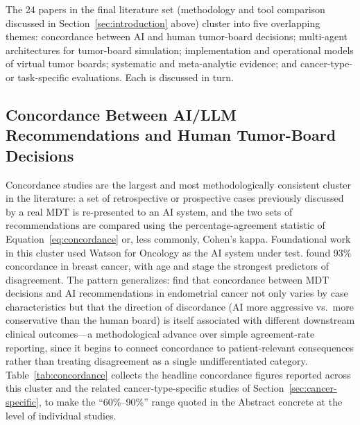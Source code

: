 \documentclass[acmsmall,screen=true,review=false,nonacm=true]{acmart}
\begin{document}
The 24 papers in the final literature set (methodology and tool comparison discussed in Section~\ref{sec:introduction} above) cluster into five overlapping themes: concordance between AI and human tumor-board decisions; multi-agent architectures for tumor-board simulation; implementation and operational models of virtual tumor boards; systematic and meta-analytic evidence; and cancer-type- or task-specific evaluations. Each is discussed in turn.

\subsection{Concordance Between AI/LLM Recommendations and Human Tumor-Board Decisions}
\label{sec:concordance}

Concordance studies are the largest and most methodologically consistent cluster in the literature: a set of retrospective or prospective cases previously discussed by a real MDT is re-presented to an AI system, and the two sets of recommendations are compared using the percentage-agreement statistic of Equation~\eqref{eq:concordance} or, less commonly, Cohen's kappa. Foundational work in this cluster used Watson for Oncology as the AI system under test. \citet{somashekhar2018} found 93\% concordance in breast cancer, with age and stage the strongest predictors of disagreement. The pattern generalizes: \citet{aliyev2026} find that concordance between MDT decisions and AI recommendations in endometrial cancer not only varies by case characteristics but that the direction of discordance (AI more aggressive vs.\ more conservative than the human board) is itself associated with different downstream clinical outcomes---a methodological advance over simple agreement-rate reporting, since it begins to connect concordance to patient-relevant consequences rather than treating disagreement as a single undifferentiated category. Table~\ref{tab:concordance} collects the headline concordance figures reported across this cluster and the related cancer-type-specific studies of Section~\ref{sec:cancer-specific}, to make the ``60\%--90\%'' range quoted in the Abstract concrete at the level of individual studies.
\end{document}
